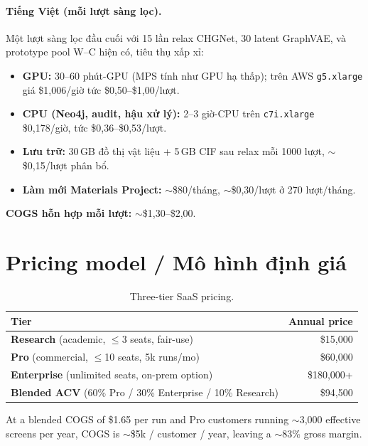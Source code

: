 \documentclass[11pt,a4paper]{report}
\begin{document}
\paragraph{Tiếng Việt (mỗi lượt sàng lọc).}
Một lượt sàng lọc đầu cuối với 15 lần relax CHGNet, 30 latent GraphVAE, và prototype pool
W--C hiện có, tiêu thụ xấp xỉ:
\begin{itemize}[leftmargin=*,itemsep=2pt]
\item \textbf{GPU:} 30--60 phút-GPU (MPS tính như GPU hạ thấp); trên AWS \texttt{g5.xlarge}
      giá \$1,006/giờ tức \$0,50--\$1,00/lượt.
\item \textbf{CPU (Neo4j, audit, hậu xử lý):} 2--3 giờ-CPU trên \texttt{c7i.xlarge}
      \$0,178/giờ, tức \$0,36--\$0,53/lượt.
\item \textbf{Lưu trữ:} 30\,GB đồ thị vật liệu + 5\,GB CIF sau relax mỗi 1000 lượt,
      $\sim$\$0,15/lượt phân bổ.
\item \textbf{Làm mới Materials Project:} $\sim$\$80/tháng, $\sim$\$0,30/lượt ở 270 lượt/tháng.
\end{itemize}
\textbf{COGS hỗn hợp mỗi lượt:} $\sim$\$1,30--\$2,00.

\section{Pricing model / Mô hình định giá}

\begin{table}[h]
\centering
\caption{Three-tier SaaS pricing.}
\label{tab:pricing}
\begin{tabular}{lr}
\toprule
\textbf{Tier} & \textbf{Annual price} \\
\midrule
\textbf{Research} (academic, $\leq$3 seats, fair-use) & \$15{,}000 \\
\textbf{Pro} (commercial, $\leq$10 seats, 5k runs/mo) & \$60{,}000 \\
\textbf{Enterprise} (unlimited seats, on-prem option) & \$180{,}000+ \\
\midrule
\textbf{Blended ACV} (60\% Pro / 30\% Enterprise / 10\% Research) & \$94{,}500 \\
\bottomrule
\end{tabular}
\end{table}

At a blended COGS of \$1.65 per run and Pro customers running $\sim$3{,}000 effective screens
per year, COGS is $\sim$\$5k / customer / year, leaving a $\sim$83\% gross margin.

\end{document}
